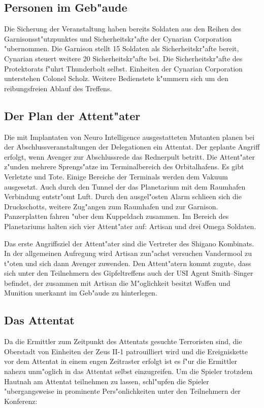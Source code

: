 \subsection{Personen im Geb"aude} 
Die Sicherung der Veranstaltung haben bereits Soldaten aus den Reihen des Garnisonsst"utzpunktes und Sicherheitskr"afte der Cynarian Corporation "ubernommen. Die Garnison stellt 15 Soldaten als Sicherheitskr"afte bereit, Cynarian steuert weitere 20 Sicherheitskr"afte bei. Die Sicherheitskr"afte des Protektorats f"uhrt Thunderbolt selbst. Einheiten der Cynarian Corporation unterstehen Colonel Scholz. Weitere Bedienstete k"ummern sich um den reibungsfreien Ablauf des Treffens.

\subsection{Der Plan der Attent"ater} 
Die mit Implantaten von Neuro Intelligence ausgestatteten Mutanten planen bei der Abschlussveranstaltungen der Delegationen ein Attentat. 
Der geplante Angriff erfolgt, wenn Avenger zur Abschlussrede das Rednerpult betritt. Die Attent"ater z"unden mehrere Sprengs"atze im Terminalbereich des Orbitalhafens. Es gibt Verletzte und Tote. Einige Bereiche der Terminals werden dem Vakuum ausgesetzt. Auch durch den  Tunnel der das Planetarium mit dem Raumhafen Verbindung entstr"omt Luft. Durch den ausgel"osten Alarm schlie\3en sich die Druckschotts, weitere Zug"angen zum Raumhafen und zur Garnison. Panzerplatten fahren "uber dem Kuppeldach zusammen. Im Bereich des Planetariums halten sich vier Attent"ater auf: Artisan und drei Omega Soldaten.

Das erste Angriffsziel der Attent"ater sind die Vertreter des Shigano Kombinats. In der allgemeinen Aufregung wird Artisan zun"achst versuchen Vandermool zu t"oten und sich dann Avenger zuwenden. Den Attent"atern kommt zugute, dass sich unter den Teilnehmern des Gipfeltreffens auch der USI Agent Smith--Singer befindet, der zusammen mit Artisan die M"oglichkeit besitzt Waffen und Munition unerkannt im Geb"aude zu hinterlegen.

\subsection{Das Attentat} 
Da die Ermittler zum Zeitpunkt des Attentats gesuchte Terroristen sind, die Oberstadt von Einheiten der Zeus II-1 patrouilliert wird und die Ereigniskette vor dem Attentat in einem engen Zeitraster erfolgt ist es f"ur die Ermittler nahezu unm"oglich in das Attentat selbst einzugreifen. Um die Spieler trotzdem Hautnah am Attentat teilnehmen zu lassen, schl"upfen die Spieler "ubergangsweise in prominente Pers"onlichkeiten unter den Teilnehmern der Konferenz:

